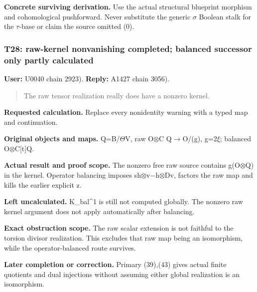 \textbf{Concrete surviving derivation.} Use the actual structural
blueprint morphism and cohomological pushforward. Never substitute the
generic \allowbreak{}\ensuremath{σ}\allowbreak{} Boolean stalk for the
\allowbreak{}\ensuremath{τ}\allowbreak{}-base or claim the source
omitted (0).

\subsubsection{T28: raw-kernel nonvanishing completed; balanced
successor only partly
calculated}\label{TranscriptLedgerStage:t28-raw-kernel-nonvanishing-completed-balanced-successor-only-partly-calculated}

\textbf{User:} U0040
\protect{} chain 2923).
\textbf{Reply:} A1427
\protect{} chain 3056).

\begin{quote}
The raw tensor realization really does have a nonzero kernel.
\end{quote}

\textbf{Requested calculation.} Replace every nonidentity warning with a
typed map and continuation.

\textbf{Original objects and maps.}
Q=B/\allowbreak{}\ensuremath{Θ}\allowbreak{}V, raw
O\allowbreak{}\ensuremath{⊗}\allowbreak{}C
Q\allowbreak{}\ensuremath{→}\allowbreak{}O/(g),
g=2\allowbreak{}\ensuremath{ξ}\allowbreak{}; balanced
O\allowbreak{}\ensuremath{⊗}\allowbreak{}C[t]Q.

\textbf{Actual result and proof scope.} The nonzero free raw source
contains g(O\allowbreak{}\ensuremath{⊗}\allowbreak{}Q) in the kernel.
Operator balancing imposes
sh\allowbreak{}\ensuremath{⊗}\allowbreak{}v\allowbreak{}\ensuremath{−}\allowbreak{}h\allowbreak{}\ensuremath{⊗}\allowbreak{}Dv,
factors the raw map and kills the earlier explicit z.

\textbf{Left uncalculated.} K\_bal\^{}1 is still not computed globally.
The nonzero raw kernel argument does not apply automatically after
balancing.

\textbf{Exact obstruction scope.} The raw scalar extension is not
faithful to the torsion divisor realization. This excludes that raw map
being an isomorphism, while the operator-balanced route survives.

\textbf{Later completion or correction.} Primary (39),(43) gives actual
finite quotients and dual injections without assuming either global
realization is an isomorphism.

